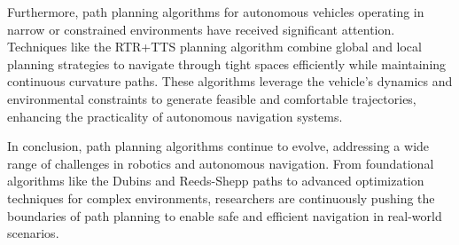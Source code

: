 \vspace*{6mm}

Furthermore, path planning algorithms for autonomous vehicles operating in narrow or constrained environments have received significant attention. Techniques like the RTR+TTS planning algorithm combine global and local planning strategies to navigate through tight spaces efficiently while maintaining continuous curvature paths. These algorithms leverage the vehicle's dynamics and environmental constraints to generate feasible and comfortable trajectories, enhancing the practicality of autonomous navigation systems.

\vspace*{6mm}

In conclusion, path planning algorithms continue to evolve, addressing a wide range of challenges in robotics and autonomous navigation. From foundational algorithms like the Dubins and Reeds-Shepp paths to advanced optimization techniques for complex environments, researchers are continuously pushing the boundaries of path planning to enable safe and efficient navigation in real-world scenarios.